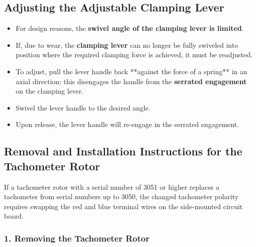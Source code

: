 \subsection*{Adjusting the Adjustable Clamping Lever}

\begin{itemize}
    \item For design reasons, the \textbf{swivel angle of the clamping lever  is limited}.
    \item If, due to wear, the \textbf{clamping lever } can no longer be fully swiveled into position where the required clamping force is achieved, it must be readjusted.
    \item To adjust, pull the lever handle back **against the force of a spring** in an axial direction; this disengages the handle from the \textbf{serrated engagement} on the clamping lever.
    \item Swivel the lever handle to the desired angle.
    \item Upon release, the lever handle will re-engage in the serrated engagement.
\end{itemize}



\setcounter{section}{60}

\subsection*{Removal and Installation Instructions for the Tachometer Rotor}


If a tachometer rotor with a serial number of 3051 or higher replaces a\\tachometer from serial numbers up to 3050,  
the changed tachometer polarity requires swapping the red and blue terminal wires on the side-mounted circuit board.

\subsubsection*{1. Removing the Tachometer Rotor}

